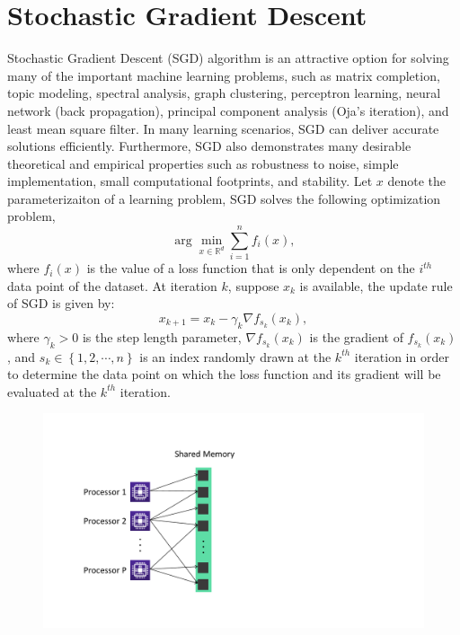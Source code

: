 \documentclass[12pt]{report}
\newcommand{\grad}{\nabla}
\newcommand{\curly}[1]{\left\{#1\right\}}
\begin{document}
\section{Stochastic Gradient Descent}
\label{sec:sgd}
Stochastic Gradient Descent (SGD) algorithm is an attractive option for solving many of the important machine learning problems, such as matrix completion, topic modeling, spectral analysis, graph clustering, perceptron learning, neural network (back propagation), principal component analysis (Oja's iteration), and least mean square filter. In many learning scenarios, SGD can deliver accurate solutions efficiently. Furthermore, SGD also demonstrates many desirable theoretical and empirical properties such as robustness to noise, simple implementation, small computational footprints, and stability. Let $x$ denote the parameterizaiton of a learning problem, SGD solves the following optimization problem,
\begin{equation*}
\arg\min_{x\in\mathbb{R}^d} \sum_{i=1}^n f_i(x),
\end{equation*}
where $f_i(x)$ is the value of a loss function that is only dependent on the $i^{th}$ data point of the dataset. At iteration $k$, suppose $x_k$ is available, the update rule of SGD is given by:
\begin{equation*}
x_{k+1} = x_k - \gamma_k \grad f_{s_k} (x_k),
\end{equation*}
where $\gamma_k > 0$ is the step length parameter, $\grad f_{s_k} (x_k)$ is the gradient of $f_{s_k} (x_k)$, and $s_k \in \curly{1,2,\cdots,n}$ is an index randomly drawn at the $k^{th}$ iteration in order to determine the data point on which the loss function and its gradient will be evaluated at the $k^{th}$ iteration.


\begin{figure}
\centering
\includegraphics[scale=0.6]{./support/parallel.pdf}
\label{fig:parallel}
\end{figure}
\end{document}
